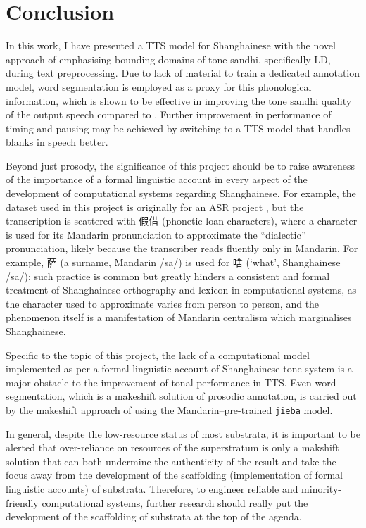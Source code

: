 \documentclass[11pt]{article}
\begin{document}
\section{Conclusion}
In this work, I have presented a TTS model for Shanghainese with the novel approach of emphasising bounding domains of tone sandhi, specifically LD, during text preprocessing. Due to lack of material to train a dedicated annotation model, word segmentation is employed as a proxy for this phonological information, which is shown to be effective in improving the tone sandhi quality of the output speech compared to \citet{VoiceOver}. Further improvement in performance of timing and pausing may be achieved by switching to a TTS model that handles blanks in speech better.

Beyond just prosody, the significance of this project should be to raise awareness of the importance of a formal linguistic account in every aspect of the development of computational systems regarding Shanghainese.
For example, the dataset used in this project is originally for an ASR project \citep{cosmos-breakCosmosBreakAsr2023}, but the transcription is scattered with 假借 (phonetic loan characters), where a character is used for its Mandarin pronunciation to approximate the ``dialectic'' pronunciation, likely because the transcriber reads fluently only in Mandarin. For example, 萨 (a surname, Mandarin /sa/) is used for 啥 (`what', Shanghainese /sa/); such practice is common but greatly hinders a consistent and formal treatment of Shanghainese orthography and lexicon in computational systems, as the character used to approximate varies from person to person, and the phenomenon itself is a manifestation of Mandarin centralism which marginalises Shanghainese.

Specific to the topic of this project, the lack of a computational model implemented as per a formal linguistic account of Shanghainese tone system is a major obstacle to the improvement of tonal performance in TTS. Even word segmentation, which is a makeshift solution of prosodic annotation, is carried out by the makeshift approach of using the Mandarin--pre-trained \texttt{jieba} model.

In general, despite the low-resource status of most substrata, it is important to be alerted that over-reliance on resources of the superstratum is only a makshift solution that can both undermine the authenticity of the result and take the focus away from the development of the scaffolding (implementation of formal linguistic accounts) of substrata.
Therefore, to engineer reliable and minority-friendly computational systems, further research should really put the development of the scaffolding of substrata at the top of the agenda.
\end{document}
